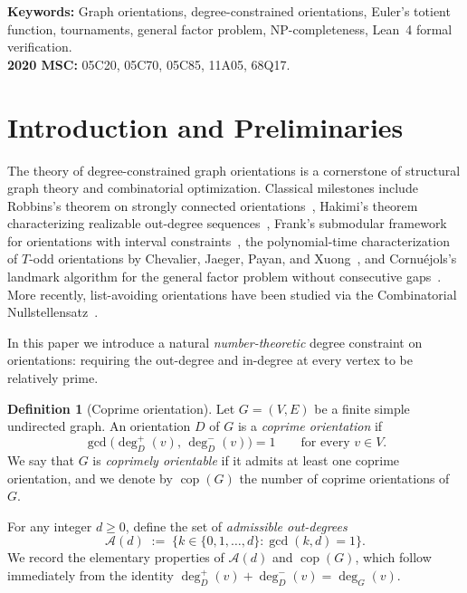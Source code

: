\documentclass[11pt,a4paper]{article}
\theoremstyle{definition}
\newtheorem{definition}[theorem]{Definition}
\theoremstyle{remark}
\newcommand{\cop}{\operatorname{cop}}
\newcommand{\outdeg}{\deg^{+}}
\newcommand{\indeg}{\deg^{-}}
\newcommand{\Aset}{\mathcal{A}}
\begin{document}
\noindent\textbf{Keywords:} Graph orientations, degree-constrained orientations, Euler's totient function, tournaments, general factor problem, NP-completeness, Lean~4 formal verification.\\
\noindent\textbf{2020 MSC:} 05C20, 05C70, 05C85, 11A05, 68Q17.

\section{Introduction and Preliminaries}

The theory of degree-constrained graph orientations is a cornerstone of structural graph theory and combinatorial optimization. Classical milestones include Robbins's theorem on strongly connected orientations~\cite{Robbins1939}, Hakimi's theorem characterizing realizable out-degree sequences~\cite{Hakimi1965}, Frank's submodular framework for orientations with interval constraints~\cite{Frank1980}, the polynomial-time characterization of $T$-odd orientations by Chevalier, Jaeger, Payan, and Xuong~\cite{Chevalier1983}, and Cornu\'ejols's landmark algorithm for the general factor problem without consecutive gaps~\cite{Cornuejols1988}. More recently, list-avoiding orientations have been studied via the Combinatorial Nullstellensatz~\cite{AlonTarsi1992,ListAvoiding2024}.

In this paper we introduce a natural \emph{number-theoretic} degree constraint on orientations: requiring the out-degree and in-degree at every vertex to be relatively prime.

\begin{definition}[Coprime orientation]
Let $G = (V, E)$ be a finite simple undirected graph. An orientation $D$ of $G$ is a \emph{coprime orientation} if
\[
  \gcd\!\bigl(\outdeg_D(v),\, \indeg_D(v)\bigr) = 1 \qquad \text{for every } v \in V.
\]
We say that $G$ is \emph{coprimely orientable} if it admits at least one coprime orientation, and we denote by $\cop(G)$ the number of coprime orientations of $G$.
\end{definition}

For any integer $d \ge 0$, define the set of \emph{admissible out-degrees}
\[
  \Aset(d) \;:=\; \bigl\{k \in \{0, 1, \dots, d\} : \gcd(k, d) = 1\bigr\}.
\]
We record the elementary properties of $\Aset(d)$ and $\cop(G)$, which follow immediately from the identity $\outdeg_D(v) + \indeg_D(v) = \deg_G(v)$.
\end{document}
